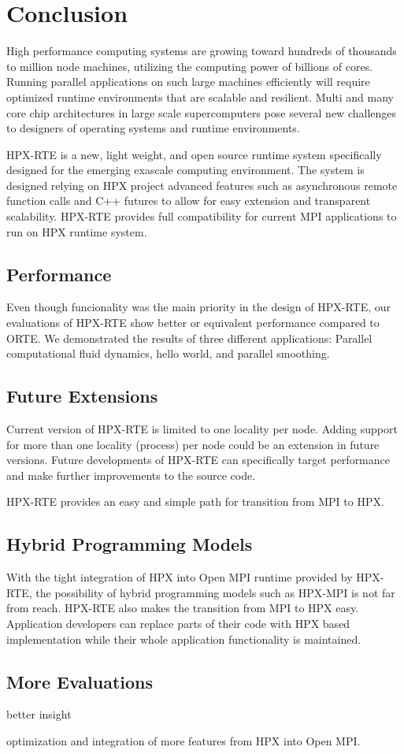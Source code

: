 \chapter{Conclusion}
\label{sec:Conclusion}

High performance computing systems are growing toward hundreds of thousands to million node machines, utilizing the computing power of billions of cores. Running parallel applications on such large machines efficiently will require optimized runtime environments that are scalable and resilient. Multi and many core chip architectures in large scale supercomputers pose several new challenges to designers of operating systems and runtime environments.

HPX-RTE is a new, light weight, and open source runtime system specifically designed for the emerging exascale computing environment. The system is designed relying on HPX project advanced features such as asynchronous remote function calls and C++ futures to allow for easy extension and transparent scalability. HPX-RTE provides full compatibility for current MPI applications to run on HPX runtime system.

\section{Performance}
Even though funcionality was the main priority in the design of HPX-RTE, our evaluations of HPX-RTE show better or equivalent performance compared to ORTE. We demonstrated the results of three different applications: Parallel computational fluid dynamics, hello world, and parallel smoothing.

\section{Future Extensions}
Current version of HPX-RTE is limited to one locality per node. Adding support for more than one locality (process) per node could be an extension in future versions.
Future developments of HPX-RTE can specifically target performance and make further improvements to the source code. 

HPX-RTE provides an easy and simple path for transition from MPI to HPX. 

\section{Hybrid Programming Models}
With the tight integration of HPX into Open MPI runtime provided by HPX-RTE, the possibility of hybrid programming models such as HPX-MPI is not far from reach. HPX-RTE also makes the transition from MPI to HPX easy. Application developers can replace parts of their code with HPX based implementation while their whole application functionality is maintained.

\section{More Evaluations}
better insight

optimization
and integration of more features from HPX into Open MPI.
